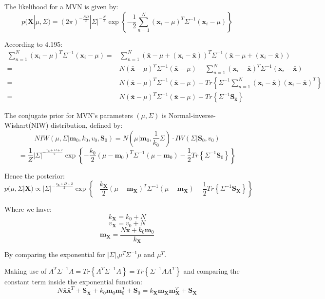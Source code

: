 \documentclass[UTF8]{ctexart}
\begin{document}
The likelihood for a MVN is given by:
$$p(\textbf{X}|\mu,\Sigma) = (2\pi)^{-\frac{ND}{2}}|\Sigma|^{-\frac{N}{2}}\exp\left\{ -\frac{1}{2}\sum_{n=1}^{N}(\textbf{x}_{i}-\mu)^{T}\Sigma^{-1}(\textbf{x}_{i}-\mu) \right\}$$

According to 4.195:
\begin{align}
\sum_{n=1}^{N}(\textbf{x}_{i}-\mu)^{T}\Sigma^{-1}(\textbf{x}_{i}-\mu) =&\sum_{n=1}^{N}(\bar{\textbf{x}} - \mu + (\textbf{x}_{i} - \bar{\textbf{x}}))^{T}\Sigma^{-1}(\bar{\textbf{x}} - \mu + (\textbf{x}_{i} - \bar{\textbf{x}})) \nonumber \\
=&N(\bar{\textbf{x}}-\mu)^{T}\Sigma^{-1}(\bar{\textbf{x}}-\mu) + \sum_{n=1}^{N}(\textbf{x}_{i} - \bar{\textbf{x}})^{T}\Sigma^{-1}(\textbf{x}_{i}-\bar{\textbf{x}}) \nonumber \\
=&N(\bar{\textbf{x}}-\mu)^{T}\Sigma^{-1}(\bar{\textbf{x}}-\mu) + Tr\left\{\Sigma^{-1}\sum_{n=1}^{N}(\textbf{x}_{i}-\bar{\textbf{x}})(\textbf{x}_{i} - \bar{\textbf{x}})^{T}\right\}\nonumber \\
=&N(\bar{\textbf{x}}-\mu)^{T}\Sigma^{-1}(\bar{\textbf{x}}-\mu) + Tr\left\{ \Sigma^{-1} \textbf{S}_{\bar{\textbf{x}}}\right\}\nonumber 
\end{align}

The conjugate prior for MVN's parameters $(\mu,\Sigma)$ is Normal-inverse-Wishart(NIW) distribution, defined by:
$$NIW(\mu,\Sigma|\textbf{m}_{0},k_{0},v_{0},\textbf{S}_{0}) = N(\mu|\textbf{m}_{0},\frac{1}{k_{0}}\Sigma)\cdot IW(\Sigma|\textbf{S}_{0},v_{0})$$
$$=\frac{1}{Z} |\Sigma|^{-\frac{v_{0} + D + 2}{2}}\exp\left\{ -\frac{k_{0}}{2}(\mu-\textbf{m}_{0})^{T}\Sigma^{-1}(\mu-\textbf{m}_{0})-\frac{1}{2}Tr\left\{ \Sigma^{-1}\textbf{S}_{0} \right\} \right\}$$

Hence the posterior:
$$p(\mu,\Sigma|\textbf{X}) \propto |\Sigma|^{-\frac{v_{\textbf{X}}+D+2}{2}}\exp\left\{ -\frac{k_{\textbf{X}}}{2}(\mu-\textbf{m}_{\textbf{X}})^{T}\Sigma^{-1}(\mu-\textbf{m}_{\textbf{X}}) - \frac{1}{2}Tr\left\{  \Sigma^{-1} \textbf{S}_{\textbf{X}}\right\} \right\}$$

Where we have:
$$k_{\textbf{X}} = k_{0} + N$$
$$v_{\textbf{X}} = v_{0} + N$$
$$\textbf{m}_{\textbf{X}} = \frac{N\bar{\textbf{x}}+k_{0}\textbf{m}_{0}}{k_{\textbf{X}}}$$

By comparing the exponential for $|\Sigma|$,$\mu^{T}\Sigma^{-1}\mu$ and $\mu^{T}$.

Making use of $A^{T}\Sigma^{-1}A = Tr\left\{ A^{T}\Sigma^{-1}A \right\} = Tr\left\{ \Sigma^{-1}AA^{T} \right\}$ and comparing the constant term inside the exponential function:
$$N \bar{\textbf{x}} \bar{\textbf{x}}^{T} + \textbf{S}_{\bar{\textbf{X}}} + k_{0}\textbf{m}_{0}\textbf{m}_{0}^{T} + \textbf{S}_{0} = k_{\textbf{X}}\textbf{m}_{\textbf{X}}\textbf{m}_{\textbf{X}}^{T} + \textbf{S}_{\textbf{X}}$$
\end{document}
